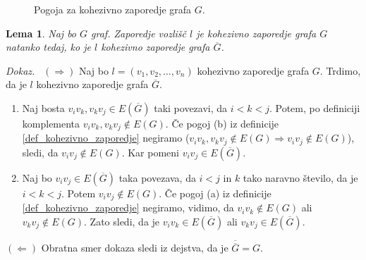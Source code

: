 \documentclass[a4paper, 12pt]{book}
\newtheorem{lema}{Lema}[chapter]
\newenvironment{dokaz}{\emph{Dokaz.}\ }{\hspace{\fill}{$\Box$}}
\begin{document}
\begin{figure}[h]
    \begin{center}        
    \end{center}
    \caption{Pogoja za kohezivno zaporedje grafa $G$.}
    \label{graf_kohezivno_zaporedje_ab}
\end{figure}

\begin{lema}
\label{lema0}
    Naj bo $G$ graf. Zaporedje vozlišč $l$ je kohezivno zaporedje grafa $G$ natanko tedaj, ko je $l$ kohezivno zaporedje grafa $\overline{G}$. 
\end{lema}
\begin{dokaz}
    $(\Rightarrow)$ Naj bo $l = (v_1, v_2, \dots, v_n)$ kohezivno zaporedje grafa $G$. Trdimo, da je $l$ kohezivno zaporedje grafa $\overline{G}$. 
    \begin{enumerate}[label=(\alph*)]
        \item Naj bosta $v_iv_k, v_kv_j \in E(\overline{G})$ taki povezavi, da $i < k < j$. Potem, po definiciji komplementa $v_iv_k, v_kv_j \notin E(G)$. Če pogoj (b) iz definicije \ref{def_kohezivno_zaporedje} negiramo ($v_iv_k, v_kv_j \notin E(G) \Rightarrow v_iv_j \notin E(G)$), sledi, da $v_iv_j \notin E(G)$. Kar pomeni $v_iv_j \in E(\overline{G})$.
        \item Naj bo $v_iv_j \in E(\overline{G})$ taka povezava, da $i < j$ in $k$ tako naravno število, da je $i < k < j$. Potem $v_iv_j \notin E(G)$. Če pogoj (a) iz definicije \ref{def_kohezivno_zaporedje} negiramo, vidimo, da $v_iv_k \notin E(G)$ ali $v_kv_j \notin E(G)$. Zato sledi, da je $v_iv_k \in E(\overline{G})$ ali $v_kv_j \in E(\overline{G})$. 
    \end{enumerate}

    $(\Leftarrow)$ Obratna smer dokaza sledi iz dejstva, da je $\overline{\overline{G}} = G$.
\end{dokaz}
\end{document}

